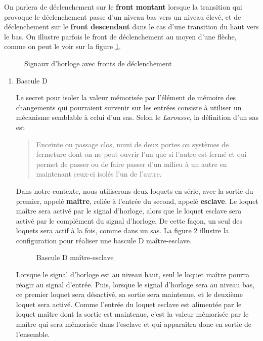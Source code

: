 \documentclass[letter, oneside]{book}
\begin{document}
On parlera de déclenchement sur le \textbf{front montant} lorsque la
transition qui provoque le déclenchement passe d'un niveau bas vers un
niveau élevé, et de déclenchement sur le \textbf{front descendant} dans le
cas d'une transition du haut vers le bas.  On illustre parfois le
front de déclenchement au moyen d'une flèche, comme on peut le voir
sur la figure \ref{fig:org681412f}.

\begin{figure}[htbp]
\centering

\caption{\label{fig:org681412f}Signaux d'horloge avec fronts de déclenchement}
\end{figure}

\begin{enumerate}
\item Bascule D
\label{sec:orgfb5f9d0}

Le secret pour isoler la valeur mémorisée par l'élément de mémoire des
changements qui pourraient survenir sur les entrées consiste à
utiliser un mécanisme semblable à celui d'un sas. Selon le \emph{Larousse}, la
définition d'un sas est

\begin{quote}
Enceinte ou passage clos, muni de deux portes ou systèmes de fermeture
dont on ne peut ouvrir l'un que si l'autre est fermé et qui permet de
passer ou de faire passer d'un milieu à un autre en maintenant ceux-ci
isolés l'un de l'autre.
\end{quote}

Dans notre contexte, nous utiliserons deux loquets en série, avec la
sortie du premier, appelé \textbf{maître}, reliée à l'entrée du second,
appelé \textbf{esclave}. Le loquet maître sera activé par le signal d'horloge,
alors que le loquet esclave sera activé par le complément du signal
d'horloge. De cette façon, un seul des loquets sera actif à la fois,
comme dans un sas. La figure \ref{fig:orga6a1483} illustre la
configuration pour réaliser une bascule D maître-esclave.

\begin{figure}[htbp]
\centering

\caption{\label{fig:orga6a1483}Bascule D maître-esclave}
\end{figure}

Lorsque le signal d'horloge est au niveau haut, seul le loquet maître
pourra réagir au signal d'entrée. Puis, lorsque le signal d'horloge
sera au niveau bas, ce premier loquet sera désactivé, sa sortie sera
maintenue, et le deuxième loquet sera activé. Comme l'entrée du loquet
esclave est alimentée par le loquet maître dont la sortie est
maintenue, c'est la valeur mémorisée par le maître qui sera mémorisée
dans l'esclave et qui apparaîtra donc en sortie de l'ensemble.


\end{enumerate}
\end{document}
